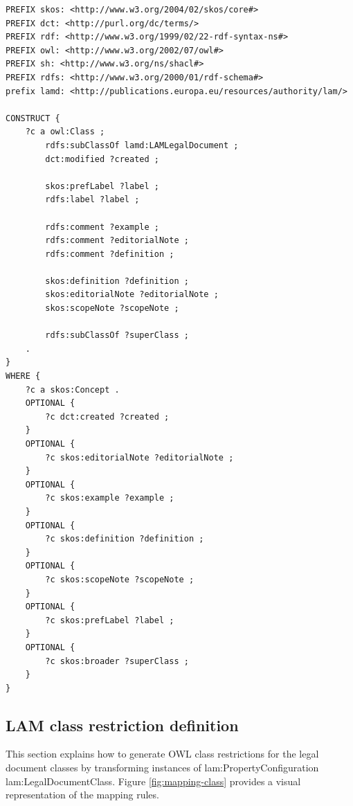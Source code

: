 	\begin{lstlisting}[language=SPARQL, captionpos=b, caption={The transformation SPARQL query for LAM legal document classes}, label=lst:sparql-legal-document]
PREFIX skos: <http://www.w3.org/2004/02/skos/core#>
PREFIX dct: <http://purl.org/dc/terms/>
PREFIX rdf: <http://www.w3.org/1999/02/22-rdf-syntax-ns#>
PREFIX owl: <http://www.w3.org/2002/07/owl#>
PREFIX sh: <http://www.w3.org/ns/shacl#>
PREFIX rdfs: <http://www.w3.org/2000/01/rdf-schema#>
prefix lamd: <http://publications.europa.eu/resources/authority/lam/>

CONSTRUCT { 
	?c a owl:Class ;
		rdfs:subClassOf lamd:LAMLegalDocument ;
		dct:modified ?created ;
		
		skos:prefLabel ?label ;
		rdfs:label ?label ;
		
		rdfs:comment ?example ;
		rdfs:comment ?editorialNote ;
		rdfs:comment ?definition ;
		
		skos:definition ?definition ;
		skos:editorialNote ?editorialNote ;
		skos:scopeNote ?scopeNote ;
		
		rdfs:subClassOf ?superClass ;
	.
} 
WHERE { 
	?c a skos:Concept .  
	OPTIONAL {
		?c dct:created ?created ;
	}	
	OPTIONAL {
		?c skos:editorialNote ?editorialNote ;
	}
	OPTIONAL {
		?c skos:example ?example ;
	}
	OPTIONAL {
		?c skos:definition ?definition ;
	}  
	OPTIONAL {
		?c skos:scopeNote ?scopeNote ;
	}    
	OPTIONAL {
		?c skos:prefLabel ?label ;
	}
	OPTIONAL {
		?c skos:broader ?superClass ;
	}
}
\end{lstlisting}

\subsection{LAM class restriction definition}

	This section explains how to generate OWL class restrictions for the legal document classes by transforming instances of  lam:PropertyConfiguration lam:LegalDocumentClass. Figure \ref{fig:mapping-class} provides a visual representation of the mapping rules.
	
